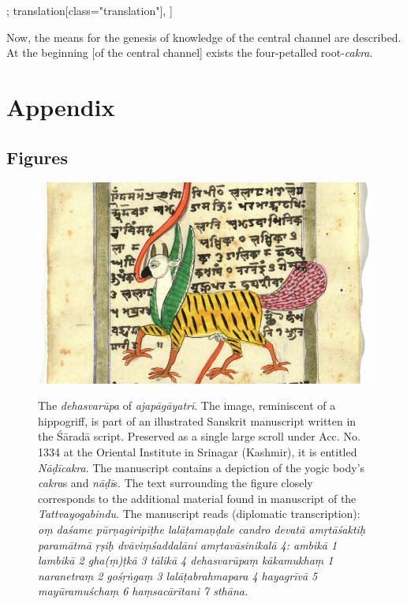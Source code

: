 \begin{alignment}[
    texts=edition[class="edition"];
    translation[class="translation"],
  ]
\begin{translation}
\begin{tlate}[p03_2]
\end{tlate}
\xmlhead[h04]{[IV. Cakra of the root}
\begin{tlate}[p04_1]
 \label{cakra1trans}  
 \noindent Now, the means for the genesis of knowledge of the central channel are described. At the beginning [of the central channel] exists the four-petalled root-\textit{cakra}.
 \flushpage
 \end{tlate}
   \end{translation}
 \end{alignment}
 \pagebreak %
\newpage
\cleardoublepage
{}
\chapter{Appendix}
\section{Figures}

\clearpage

  \begin{figure}[ht]
	\centering
  \includegraphics[width=1\textwidth]{pics/Wolpertinger.png}
\caption[The \textit{dehasvarūpa} of \textit{ajapāgāyatrī}]{The \textit{dehasvarūpa} of \textit{ajapāgāyatrī}. The image, reminiscent of a hippogriff, is part of an illustrated Sanskrit manuscript written in the Śāradā script. Preserved as a single large scroll under Acc. No. 1334 at the Oriental Institute in Srinagar (Kashmir), it is entitled \textit{Nāḍīcakra}. The manuscript contains a depiction of the yogic body’s \textit{cakra}s and \textit{nāḍī}s. The text surrounding the figure closely corresponds to the additional material found in manuscript  of the \textit{Tattvayogabindu}. The manuscript reads (diplomatic transcription): \textit{oṃ daśame pūrṇagiripīṭhe lalāṭamaṇḍale candro devatā amṛtāśaktiḥ paramātmā ṛṣiḥ dvāviṃśaddalāni amṛtavāsinikalā 4: ambikā 1 lambikā 2 gha(ṃ)ṭkā 3 tālikā 4 dehasvarūpaṃ kākamukhaṃ 1 naranetraṃ 2 gośṛṅgaṃ 3 lalāṭabrahmapara 4 hayagrīvā 5 mayūramuśchaṃ 6 haṃsacārītani 7 sthāna.}}
	\label{fig_wolpertinger}
      \end{figure}

